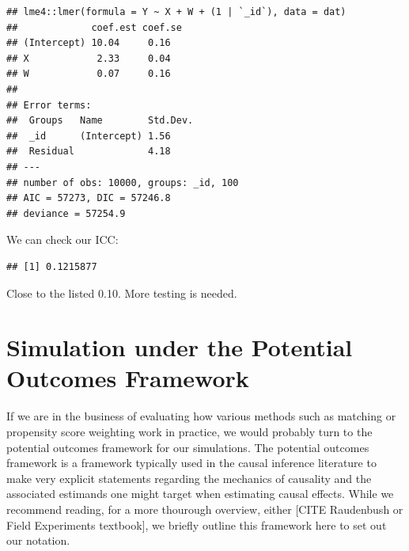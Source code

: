 \documentclass[
]{book}
\newenvironment{Shaded}{\begin{snugshade}}{\end{snugshade}}
\newcommand{\AttributeTok}[1]{\textcolor[rgb]{0.13,0.29,0.53}{#1}}
\newcommand{\DecValTok}[1]{\textcolor[rgb]{0.00,0.00,0.81}{#1}}
\newcommand{\FunctionTok}[1]{\textcolor[rgb]{0.13,0.29,0.53}{\textbf{#1}}}
\newcommand{\NormalTok}[1]{#1}
\newcommand{\OtherTok}[1]{\textcolor[rgb]{0.56,0.35,0.01}{#1}}
\newcommand{\SpecialCharTok}[1]{\textcolor[rgb]{0.81,0.36,0.00}{\textbf{#1}}}
\newcommand{\StringTok}[1]{\textcolor[rgb]{0.31,0.60,0.02}{#1}}
\begin{document}
\begin{verbatim}
## lme4::lmer(formula = Y ~ X + W + (1 | `_id`), data = dat)
##             coef.est coef.se
## (Intercept) 10.04     0.16  
## X            2.33     0.04  
## W            0.07     0.16  
## 
## Error terms:
##  Groups   Name        Std.Dev.
##  _id      (Intercept) 1.56    
##  Residual             4.18    
## ---
## number of obs: 10000, groups: _id, 100
## AIC = 57273, DIC = 57246.8
## deviance = 57254.9
\end{verbatim}

We can check our ICC:

\begin{Shaded}
\end{Shaded}

\begin{verbatim}
## [1] 0.1215877
\end{verbatim}

Close to the listed 0.10. More testing is needed.

\chapter{Simulation under the Potential Outcomes Framework}\label{potential-outcomes}

If we are in the business of evaluating how various methods such as matching or propensity score weighting work in practice, we would probably turn to the potential outcomes framework for our simulations.
The potential outcomes framework is a framework typically used in the causal inference literature to make very explicit statements regarding the mechanics of causality and the associated estimands one might target when estimating causal effects.
While we recommend reading, for a more thourough overview, either {[}CITE Raudenbush or Field Experiments textbook{]}, we briefly outline this framework here to set out our notation.
\end{document}
